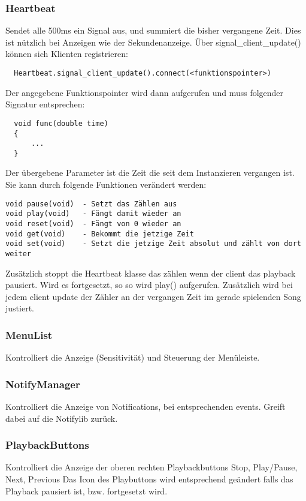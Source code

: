 \subsubsection{Heartbeat}
Sendet alle 500ms ein Signal aus, und summiert die bisher vergangene Zeit.
Dies ist nützlich bei Anzeigen wie der Sekundenanzeige.
Über signal\_client\_update() können sich Klienten registrieren:
\begin{verbatim}
  Heartbeat.signal_client_update().connect(<funktionspointer>)
\end{verbatim}
Der angegebene Funktionspointer wird dann aufgerufen und muss folgender Signatur entsprechen:
\begin{verbatim}
  void func(double time)
  {
      ...
  }
\end{verbatim}

Der übergebene Parameter ist die Zeit die seit dem Instanzieren vergangen ist. 
Sie kann durch folgende Funktionen verändert werden:
\begin{verbatim}
void pause(void)  - Setzt das Zählen aus
void play(void)   - Fängt damit wieder an
void reset(void)  - Fängt von 0 wieder an
void get(void)    - Bekommt die jetzige Zeit
void set(void)    - Setzt die jetzige Zeit absolut und zählt von dort weiter
\end{verbatim}

Zusätzlich stoppt die Heartbeat klasse das zählen wenn der client das playback pausiert.
Wird es fortgesetzt, so so wird play() aufgerufen. 
Zusätzlich wird bei jedem client update der Zähler an der vergangen Zeit im gerade spielenden Song justiert.

\subsubsection{MenuList}
Kontrolliert die Anzeige (Sensitivität) und Steuerung der Menüleiste.

\subsubsection{NotifyManager}
Kontrolliert die Anzeige von Notifications, bei entsprechenden events.
Greift dabei auf die Notifylib zurück.

\subsubsection{PlaybackButtons}
Kontrolliert die Anzeige der oberen rechten Playbackbuttons Stop, Play/Pause, Next, Previous
Das Icon des Playbuttons wird entsprechend geändert falls das Playback pausiert ist,
bzw. fortgesetzt wird.


